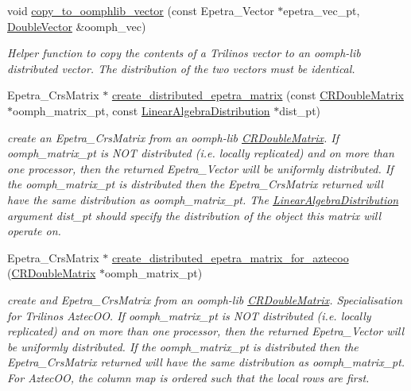\begin{DoxyCompactItemize}
void \hyperlink{namespaceoomph_1_1TrilinosEpetraHelpers_a302ed5d22db12175522a3fcf304856c9}{copy\+\_\+to\+\_\+oomphlib\+\_\+vector} (const Epetra\+\_\+\+Vector $\ast$epetra\+\_\+vec\+\_\+pt, \hyperlink{classoomph_1_1DoubleVector}{Double\+Vector} \&oomph\+\_\+vec)
\begin{DoxyCompactList}\small\item\em Helper function to copy the contents of a Trilinos vector to an oomph-\/lib distributed vector. The distribution of the two vectors must be identical. \end{DoxyCompactList}\item 
Epetra\+\_\+\+Crs\+Matrix $\ast$ \hyperlink{namespaceoomph_1_1TrilinosEpetraHelpers_a0a8d24c6cf06d8c71bb414c153a276cf}{create\+\_\+distributed\+\_\+epetra\+\_\+matrix} (const \hyperlink{classoomph_1_1CRDoubleMatrix}{C\+R\+Double\+Matrix} $\ast$oomph\+\_\+matrix\+\_\+pt, const \hyperlink{classoomph_1_1LinearAlgebraDistribution}{Linear\+Algebra\+Distribution} $\ast$dist\+\_\+pt)
\begin{DoxyCompactList}\small\item\em create an Epetra\+\_\+\+Crs\+Matrix from an oomph-\/lib \hyperlink{classoomph_1_1CRDoubleMatrix}{C\+R\+Double\+Matrix}. If oomph\+\_\+matrix\+\_\+pt is N\+OT distributed (i.\+e. locally replicated) and on more than one processor, then the returned Epetra\+\_\+\+Vector will be uniformly distributed. If the oomph\+\_\+matrix\+\_\+pt is distributed then the Epetra\+\_\+\+Crs\+Matrix returned will have the same distribution as oomph\+\_\+matrix\+\_\+pt. The \hyperlink{classoomph_1_1LinearAlgebraDistribution}{Linear\+Algebra\+Distribution} argument dist\+\_\+pt should specify the distribution of the object this matrix will operate on. \end{DoxyCompactList}\item 
Epetra\+\_\+\+Crs\+Matrix $\ast$ \hyperlink{namespaceoomph_1_1TrilinosEpetraHelpers_a1b96bb02b661a770a7b5830af771a249}{create\+\_\+distributed\+\_\+epetra\+\_\+matrix\+\_\+for\+\_\+aztecoo} (\hyperlink{classoomph_1_1CRDoubleMatrix}{C\+R\+Double\+Matrix} $\ast$oomph\+\_\+matrix\+\_\+pt)
\begin{DoxyCompactList}\small\item\em create and Epetra\+\_\+\+Crs\+Matrix from an oomph-\/lib \hyperlink{classoomph_1_1CRDoubleMatrix}{C\+R\+Double\+Matrix}. Specialisation for Trilinos Aztec\+OO. If oomph\+\_\+matrix\+\_\+pt is N\+OT distributed (i.\+e. locally replicated) and on more than one processor, then the returned Epetra\+\_\+\+Vector will be uniformly distributed. If the oomph\+\_\+matrix\+\_\+pt is distributed then the Epetra\+\_\+\+Crs\+Matrix returned will have the same distribution as oomph\+\_\+matrix\+\_\+pt. For Aztec\+OO, the column map is ordered such that the local rows are first. \end{DoxyCompactList}\item 

\end{DoxyCompactItemize}
